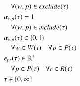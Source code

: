 \begin{alignat}{2}
	& \quad \forall (w, p) \in exclude(\tau)                          \label{eqn:exclusion_constraint}  \\
	& \alpha_{wp}(\tau) = 1 \notag\\ 
	& \quad \forall (w, p) \in include(\tau)                          \label{eqn:inclusion_constraint}  \\
	& \alpha_{wp}(\tau) \in \{0, 1\} \notag\\
	& \quad \forall w \in W(\tau) \quad \forall p \in P(\tau)     \label{eqn:x_integrality_constraint}     \\ 
	& \epsilon_{pr}(\tau) \in \mathbb{R}^{+} \notag\\ 
	& \quad \forall p \in P(\tau) \quad \forall r \in R(\tau)                           \label{eqn:p_non_negativity_constraint}  \\ 
	& \tau \in  [0, \infty] 
\end{alignat}
